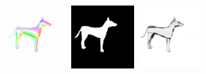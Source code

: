     \includegraphics[width=0.18\textwidth]{ch-tomnet/images/Synth/synthetic_1_dog__0000_gradient_7152_fcolor.jpg}
    \includegraphics[width=0.18\textwidth]{ch-tomnet/images/Synth/synthetic_1_dog__0000_gradient_7152_mask.png}
    \includegraphics[width=0.18\textwidth]{ch-tomnet/images/Synth/synthetic_1_dog__0000_gradient_7152_rho.png}
    \\

